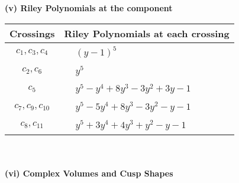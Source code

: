\documentclass[1p]{elsarticle_modified}
\theoremstyle{definition}
\begin{document}
\newpage\renewcommand{\arraystretch}{1}
\flushleft \textbf{(v) Riley Polynomials at the component}\newline \\
\begin{tabular}{m{50pt}|m{274pt}}
Crossings & \hspace{64pt}Riley Polynomials at each crossing \\
\hline $$\begin{aligned}c_{1},c_{3},c_{4}\end{aligned}$$&$\begin{aligned}
&(y-1)^5
\end{aligned}$\\
\hline $$\begin{aligned}c_{2},c_{6}\end{aligned}$$&$\begin{aligned}
&y^5
\end{aligned}$\\
\hline $$\begin{aligned}c_{5}\end{aligned}$$&$\begin{aligned}
&y^5- y^4+8 y^3-3 y^2+3 y-1
\end{aligned}$\\
\hline $$\begin{aligned}c_{7},c_{9},c_{10}\end{aligned}$$&$\begin{aligned}
&y^5-5 y^4+8 y^3-3 y^2- y-1
\end{aligned}$\\
\hline $$\begin{aligned}c_{8},c_{11}\end{aligned}$$&$\begin{aligned}
&y^5+3 y^4+4 y^3+y^2- y-1
\end{aligned}$\\
\hline
\end{tabular}\\~\\
\newpage\flushleft \textbf{(vi) Complex Volumes and Cusp Shapes}
\end{document}

